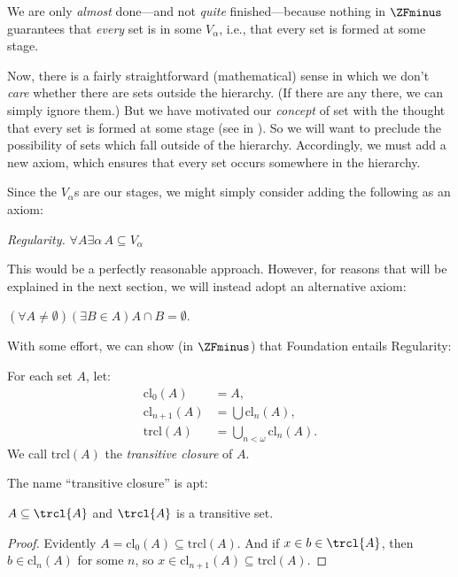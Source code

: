 \documentclass[../../../include/open-logic-section]{subfiles}
\begin{document}

We are only \emph{almost} done---and not \emph{quite} finished---because nothing in
$\ZFminus$ guarantees that \emph{every} set is in some $V_\alpha$,
i.e., that every set is formed at some stage. 

Now, there is a fairly straightforward (mathematical) sense in which
we don't \emph{care} whether there are sets outside the hierarchy. (If
there are any there, we can simply ignore them.) But we have motivated
our \emph{concept} of set with the thought that every set is formed at
some stage (see \stageshier{} in ). So
we will want to preclude the possibility of sets which fall outside of
the hierarchy. Accordingly, we must add a new axiom, which ensures
that every set occurs somewhere in the hierarchy. 

Since the $V_\alpha$s are our stages, we might simply consider adding
the following as an axiom:

\begin{defish}
\emph{Regularity.} $\forall A \exists \alpha\, A \subseteq V_\alpha$
\end{defish}

This would be a perfectly reasonable approach. However, for reasons
that will be explained in the next section, we will instead adopt an
alternative axiom:

\begin{axiom}[Foundation]
$(\forall A \neq \emptyset)(\exists B \in A)A \cap B = \emptyset$.
\end{axiom}

With some effort, we can show (in $\ZFminus$) that Foundation entails Regularity:
\begin{defn}
For each set $A$, let:
\begin{align*}
	\text{cl}_0(A) &= A,\\
	\text{cl}_{n+1}(A) &= \bigcup \text{cl}_n(A),\\
	\text{trcl}(A) &= \bigcup_{n < \omega} \text{cl}_{n}(A).
\end{align*}
We call $\text{trcl}(A)$ the \emph{transitive closure} of $A$.
\end{defn}
\noindent
The name ``transitive closure'' is apt:
\begin{prop}
$A \subseteq \trcl{A}$ and $\trcl{A}$ is a transitive set. 
\end{prop}

\begin{proof}
Evidently $A = \text{cl}_0(A) \subseteq \text{trcl}(A)$. And if $x
\in b \in \trcl{A}$,  then $b \in \text{cl}_n(A)$ for some $n$, so $x
\in \text{cl}_{n+1}(A) \subseteq \text{trcl}(A)$. 
\end{proof}
\end{document}
